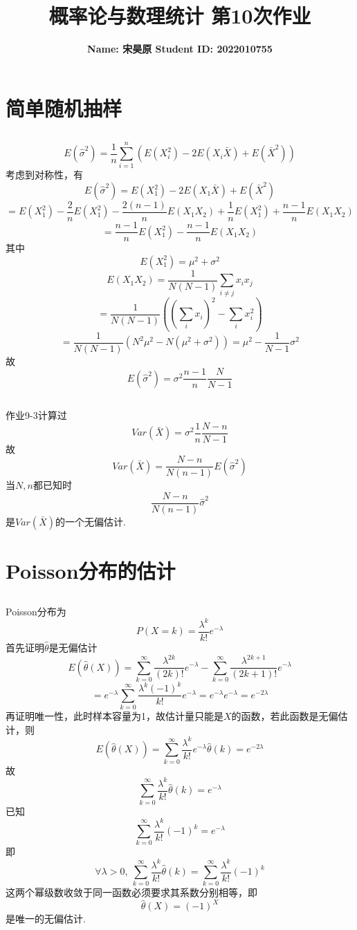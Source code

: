 \documentclass{article}
\title{\bf\Large  概率论与数理统计 第10次作业}
\author{\bf Name: 宋昊原 \qquad Student ID: 2022010755}
\begin{document}
\begin{CJK}{UTF8}{gbsn}
\maketitle
\section{简单随机抽样}
\subsection{}
$$ E(\hat{\sigma}^{2})=\frac{1}{n}\sum\limits_{i=1}^{n}(E(X_{i}^{2})-2E(X_{i}\bar{X})+E(\bar{X}^{2}))$$
考虑到对称性，有
$$ E(\hat{\sigma}^{2})=E(X_{1}^{2})-2E(X_{1}\bar{X})+E(\bar{X}^{2})$$
$$ =E(X_{1}^{2})-\frac{2}{n}E(X_{1}^{2})-\frac{2(n-1)}{n}E(X_{1}X_{2})+\frac{1}{n}E(X_{1}^{2})+\frac{n-1}{n}E(X_{1}X_{2})$$
$$ =\frac{n-1}{n}E(X_{1}^{2})-\frac{n-1}{n}E(X_{1}X_{2})$$
其中
$$ E(X_{1}^{2})=\mu^{2}+\sigma^{2}$$
$$ E(X_{1}X_{2})=\frac{1}{N(N-1)}\sum\limits_{i\neq j}x_{i}x_{j}$$
$$ =\frac{1}{N(N-1)}((\sum\limits_{i}x_{i})^{2}-\sum\limits_{i}x_{i}^{2})$$
$$ =\frac{1}{N(N-1)}(N^{2}\mu^{2}-N(\mu^{2}+\sigma^{2}))=\mu^{2}-\frac{1}{N-1}\sigma^{2}$$
故
$$ E(\hat{\sigma}^{2})=\sigma^{2}\frac{n-1}{n}\frac{N}{N-1}$$
\subsection{}
作业9-3计算过
$$ Var(\bar{X})=\sigma^{2}\frac{1}{n}\frac{N-n}{N-1}$$
故
$$ Var(\bar{X})=\frac{N-n}{N(n-1)}E(\hat{\sigma}^{2})$$
当$N,n$都已知时
$$ \frac{N-n}{N(n-1)}\hat{\sigma}^{2}$$
是$Var(\bar{X})$的一个无偏估计.
\section{Poisson分布的估计}
\subsection{}
Poisson分布为
$$ P(X=k)=\frac{\lambda^{k}}{k!}e^{-\lambda}$$
首先证明$\hat{\theta}$是无偏估计
$$E(\hat{\theta}(X))=\sum\limits_{k=0}^{\infty}\frac{\lambda^{2k}}{(2k)!}e^{-\lambda}-\sum\limits_{k=0}^{\infty}\frac{\lambda^{2k+1}}{(2k+1)!}e^{-\lambda}$$
$$=e^{-\lambda}\sum\limits_{k=0}^{\infty}\frac{\lambda^{k}(-1)^{k}}{k!}e^{-\lambda}=e^{-\lambda}e^{-\lambda}=e^{-2\lambda}$$
再证明唯一性，此时样本容量为1，故估计量只能是$X$的函数，若此函数是无偏估计，则
$$ E(\hat{\theta}(X))=\sum\limits_{k=0}^{\infty}\frac{\lambda^{k}}{k!}e^{-\lambda}\hat{\theta}(k)=e^{-2\lambda}$$
故
$$\sum\limits_{k=0}^{\infty}\frac{\lambda^{k}}{k!}\hat{\theta}(k)=e^{-\lambda}$$
已知
$$\sum\limits_{k=0}^{\infty}\frac{\lambda^{k}}{k!}(-1)^{k}=e^{-\lambda}$$
即
$$\forall\lambda>0,\ \sum\limits_{k=0}^{\infty}\frac{\lambda^{k}}{k!}\hat{\theta}(k)=\sum\limits_{k=0}^{\infty}\frac{\lambda^{k}}{k!}(-1)^{k}$$
这两个幂级数收敛于同一函数必须要求其系数分别相等，即
$$ \hat{\theta}(X)=(-1)^{X}$$
是唯一的无偏估计.

\end{CJK}
\end{document}
